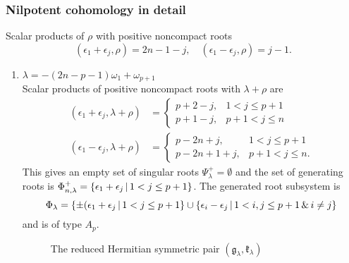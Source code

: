 \subsubsection{Nilpotent cohomology in detail}

Scalar products of $\rho$ with positive noncompact roots
\begin{equation}\label{eq:Dn_rho_scalar_posroots}
 (\epsilon_1 + \epsilon_j, \rho) = 2n-1-j, \quad (\epsilon_1 - \epsilon_j, \rho) = j -1.
\end{equation}


\begin{enumerate}
 \item $ \lambda =  -(2n-p-1)\omega_1+\omega_{p+1}$\\
   Scalar products of positive noncompact roots with $\lambda+\rho$ are
  \begin{align*}
    (\epsilon_1 + \epsilon_j, \lambda+\rho) & = \begin{cases}
                                                 p+2-j, & 1<j\leq p+1 \\
                                                 p+1-j, & p+1<j\leq n
                                                \end{cases}\\
    (\epsilon_1 - \epsilon_j, \lambda+\rho) & = \begin{cases}
                                                 p-2n+j, & 1<j\leq p+1 \\
                                                 p-2n+1+j, & p+1<j\leq n.
                                                \end{cases}
  \end{align*}
  This gives an empty set of singular roots $\Psi^+_\lambda = \emptyset$ and the set of generating roots is $\Phi^+_{n,\lambda} = \{\epsilon_1 + \epsilon_j \,|\, 1<j\leq p+1 \}$. The generated root subsystem is
  \[
   \Phi_\lambda = \{ \pm(\epsilon_1 + \epsilon_j \,|\, 1<j\leq p+1 \} \cup \{ \epsilon_i - \epsilon_j \,|\, 1 < i,j \leq p+1 \,\&\, i\neq j \}
  \]
  and is of type $A_p$.

\begin{figure}[H]
\centering
{}  
  \caption{The reduced Hermitian symmetric pair $(\mathfrak{g}_\lambda, \mathfrak{k}_\lambda)$}
\end{figure}
  

\end{enumerate}
